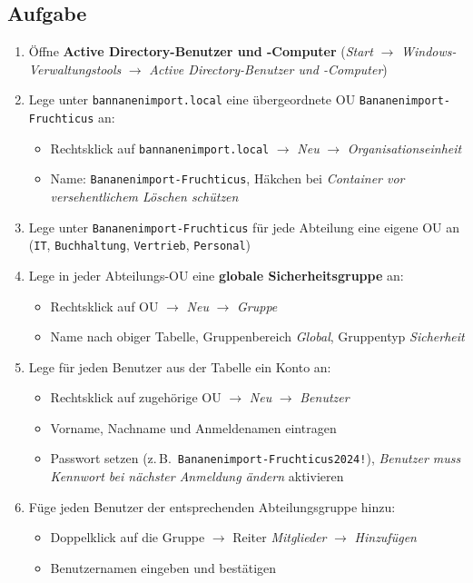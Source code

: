 \documentclass[11pt, oneside, numbers=noenddot]{scrbook}
\begin{document}
\subsection*{Aufgabe}
\begin{enumerate}
  \item Öffne \textbf{Active Directory-Benutzer und -Computer} (\textit{Start} $\rightarrow$ \textit{Windows-Verwaltungstools} $\rightarrow$ \textit{Active Directory-Benutzer und -Computer})
  \item Lege unter \texttt{bannanenimport.local} eine übergeordnete OU \texttt{Bananenimport-Fruchticus} an:
  \begin{itemize}
    \item Rechtsklick auf \texttt{bannanenimport.local} $\rightarrow$ \textit{Neu} $\rightarrow$ \textit{Organisationseinheit}
    \item Name: \texttt{Bananenimport-Fruchticus}, Häkchen bei \textit{Container vor versehentlichem Löschen schützen}
  \end{itemize}
  \item Lege unter \texttt{Bananenimport-Fruchticus} für jede Abteilung eine eigene OU an (\texttt{IT}, \texttt{Buchhaltung}, \texttt{Vertrieb}, \texttt{Personal})
  \item Lege in jeder Abteilungs-OU eine \textbf{globale Sicherheitsgruppe} an:
  \begin{itemize}
    \item Rechtsklick auf OU $\rightarrow$ \textit{Neu} $\rightarrow$ \textit{Gruppe}
    \item Name nach obiger Tabelle, Gruppenbereich \textit{Global}, Gruppentyp \textit{Sicherheit}
  \end{itemize}
  \item Lege für jeden Benutzer aus der Tabelle ein Konto an:
  \begin{itemize}
    \item Rechtsklick auf zugehörige OU $\rightarrow$ \textit{Neu} $\rightarrow$ \textit{Benutzer}
    \item Vorname, Nachname und Anmeldenamen eintragen
    \item Passwort setzen (z.\,B.\ \texttt{Bananenimport-Fruchticus2024!}), \textit{Benutzer muss Kennwort bei nächster Anmeldung ändern} aktivieren
  \end{itemize}
  \item Füge jeden Benutzer der entsprechenden Abteilungsgruppe hinzu:
  \begin{itemize}
    \item Doppelklick auf die Gruppe $\rightarrow$ Reiter \textit{Mitglieder} $\rightarrow$ \textit{Hinzufügen}
    \item Benutzernamen eingeben und bestätigen
  \end{itemize}
\end{enumerate}
\end{document}
